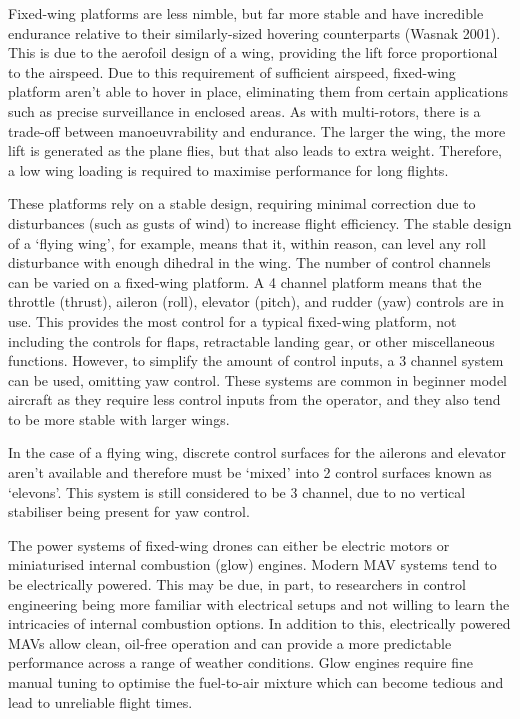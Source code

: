 Fixed-wing platforms are less nimble, but far more stable and have incredible endurance relative to their similarly-sized hovering counterparts (Wasnak 2001). This is due to the aerofoil design of a wing, providing the lift force proportional to the airspeed. Due to this requirement of sufficient airspeed, fixed-wing platform aren’t able to hover in place, eliminating them from certain applications such as precise surveillance in enclosed areas. As with multi-rotors, there is a trade-off between manoeuvrability and endurance. The larger the wing, the more lift is generated as the plane flies, but that also leads to extra weight. Therefore, a low wing loading is required to maximise performance for long flights.

These platforms rely on a stable design, requiring minimal correction due to disturbances (such as gusts of wind) to increase flight efficiency. The stable design of a ‘flying wing’, for example, means that it, within reason, can level any roll disturbance with enough dihedral in the wing.
The number of control channels can be varied on a fixed-wing platform. A 4 channel platform means that the throttle (thrust), aileron (roll), elevator (pitch), and rudder (yaw) controls are in use. This provides the most control for a typical fixed-wing platform, not including the controls for flaps, retractable landing gear, or other miscellaneous functions. However, to simplify the amount of control inputs, a 3 channel system can be used, omitting yaw control. These systems are common in beginner model aircraft as they require less control inputs from the operator, and they also tend to be more stable with larger wings.

In the case of a flying wing, discrete control surfaces for the ailerons and elevator aren’t available and therefore must be ‘mixed’ into 2 control surfaces known as ‘elevons’. This system is still considered to be 3 channel, due to no vertical stabiliser being present for yaw control.

The power systems of fixed-wing drones can either be electric motors or miniaturised internal combustion (glow) engines. Modern MAV systems tend to be electrically powered. This may be due, in part, to researchers in control engineering being more familiar with electrical setups and not willing to learn the intricacies of internal combustion options. In addition to this, electrically powered MAVs allow clean, oil-free operation and can provide a more predictable performance across a range of weather conditions. Glow engines require fine manual tuning to optimise the fuel-to-air mixture which can become tedious and lead to unreliable flight times.

